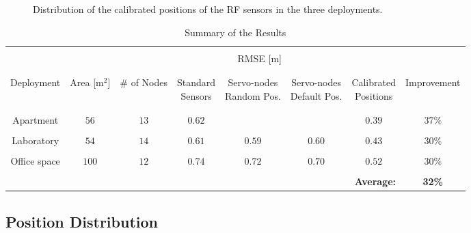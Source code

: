\documentclass[conference]{IEEEtran}
\begin{document}
\begin{figure}
    \begin{center}
        \caption{Distribution of the calibrated positions of the RF sensors in the three deployments.}
        \label{fig:sensors_pos_distr}
    \end{center}
\end{figure}



\begin{center}
\begin{table*}[t!]
    \caption{Summary of the Results} \centering
        \footnotesize
        \begin{tabular}{c  c  c | c  c  c  c | c}
        \hline\hline \\ [-2.0ex]
        &  &  & \multicolumn{3}{c}{RMSE [m]} & \\
        \\ [-2.0ex]
        \hline
        \\ [-2.0ex]
        Deployment & Area [m$^2$] & \# of Nodes & \shortstack{Standard\\Sensors} & \shortstack{Servo-nodes\\Random Pos.} & \shortstack{Servo-nodes\\Default Pos.} & \shortstack{Calibrated\\Positions} & Improvement\\
        \\ [-2.0ex]
        \hline
        \\ [-2.0ex]
        Apartment    & $56$  & $13$ & $0.62$ &        &        & $0.39$ & $37\%$\\ \\ [-2.0ex]
        Laboratory   & $54$  & $14$ & $0.61$ & $0.59$ & $0.60$ & $0.43$ & $30\%$\\ \\ [-2.0ex]
        Office space & $100$ & $12$ & $0.74$ & $0.72$ & $0.70$ & $0.52$ & $30\%$\\ \\ [-2.0ex]
        \hline \multicolumn{5}{c}{} & \multicolumn{2}{r|}{\bf Average:} & \bf 32\% \\
        \end{tabular}
        \label{T:results_summary}
\end{table*}
\end{center}

\subsection{Position Distribution}
\end{document}
